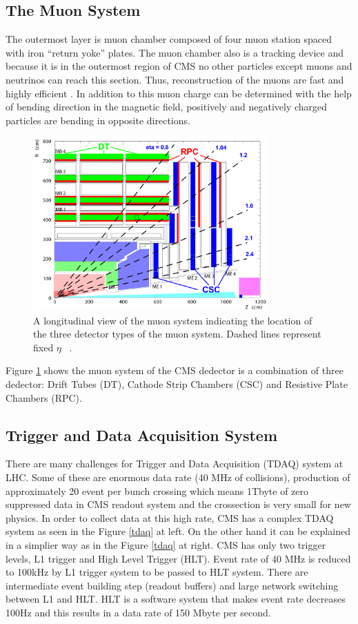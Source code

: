 \documentclass[12pt,oneandhalf,chaparabic,phys,ms,eng]{metu}
\begin{document}
\subsection{The Muon System}

The outermost layer is muon chamber composed of four muon station spaced with iron “return yoke” plates. The muon chamber also is a tracking device and because it is in the outermost region of CMS no other particles except muons and neutrinos can reach this section. Thus, reconstruction of  the muons are fast and highly efficient \cite{R16}. In addition to this muon charge can be determined with the help of bending direction in the magnetic field, positively and negatively charged particles are bending in opposite directions. 

\begin{figure}  [!hbt]
\centering
    \includegraphics[width=0.8\textwidth]{muon2}
    \caption{\label{muon2}A longitudinal view of the muon system indicating the location of the three detector types of the muon system. Dashed lines represent fixed $\eta$ ~\cite{R16}.}
\end{figure}

Figure \ref{muon2} shows the muon system of the CMS dedector is a combination of three dedector: Drift Tubes (DT), Cathode Strip Chambers (CSC) and Resistive Plate Chambers (RPC). 

\subsection{Trigger and Data Acquisition System}
\label{triggerexp}
There are many challenges for Trigger and Data Acquisition (TDAQ) system at LHC. Some of these are enormous data rate (40 MHz of collisions), production of approximately 20 event per bunch crossing which means 1Tbyte of zero suppressed data in CMS readout system and the crossection is very small for new physics.  In order to collect data at this high rate, CMS has a complex TDAQ system as seen in the Figure \ref{tdaq} at left. On the other hand it can be explained in a simplier way as in the Figure \ref{tdaq} at right. CMS has only two  trigger levels, L1 trigger and High Level Trigger (HLT). Event rate of 40 MHz is reduced to 100kHz by L1 trigger system to be passed to HLT system. There are intermediate event building step (readout buffers) and large network switching between L1 and HLT. HLT is a software system that makes event rate decreases 100Hz and this results in a data rate of 150 Mbyte per second.
\end{document}
